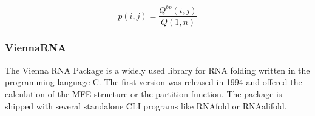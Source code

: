 \begin{equation*}
	p(i,j)= \frac{Q^{bp}(i,j)}{Q(1,n)}
\end{equation*} 

\subsubsection{ViennaRNA}
The Vienna RNA Package  is a widely used library for RNA folding written in the programming language C. The first version was released in 1994 and offered the calculation of the MFE structure or the partition function. The package is shipped with several standalone CLI programs like RNAfold or RNAalifold. 


